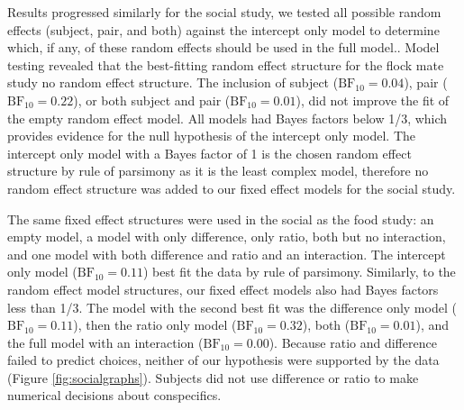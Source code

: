 \documentclass[
  ,doc,floatsintext]{apa6}
\begin{document}
Results progressed similarly for the social study, we tested all possible random effects (subject, pair, and both) against the intercept only model to determine which, if any, of these random effects should be used in the full model.. Model testing revealed that the best-fitting random effect structure for the flock mate study no random effect structure. The inclusion of subject (\(\mathrm{BF}_{\textrm{10}} = 0.04\)), pair (\(\mathrm{BF}_{\textrm{10}} = 0.22\)), or both subject and pair (\(\mathrm{BF}_{\textrm{10}} = 0.01\)), did not improve the fit of the empty random effect model. All models had Bayes factors below 1/3, which provides evidence for the null hypothesis of the intercept only model. The intercept only model with a Bayes factor of 1 is the chosen random effect structure by rule of parsimony as it is the least complex model, therefore no random effect structure was added to our fixed effect models for the social study.

The same fixed effect structures were used in the social as the food study: an empty model, a model with only difference, only ratio, both but no interaction, and one model with both difference and ratio and an interaction. The intercept only model (\(\mathrm{BF}_{\textrm{10}} = 0.11\)) best fit the data by rule of parsimony. Similarly, to the random effect model structures, our fixed effect models also had Bayes factors less than 1/3. The model with the second best fit was the difference only model (\(\mathrm{BF}_{\textrm{10}} = 0.11\)), then the ratio only model (\(\mathrm{BF}_{\textrm{10}} = 0.32\)), both (\(\mathrm{BF}_{\textrm{10}} = 0.01\)), and the full model with an interaction (\(\mathrm{BF}_{\textrm{10}} = 0.00\)). Because ratio and difference failed to predict choices, neither of our hypothesis were supported by the data (Figure \ref{fig:socialgraphs}). Subjects did not use difference or ratio to make numerical decisions about conspecifics.
\end{document}
